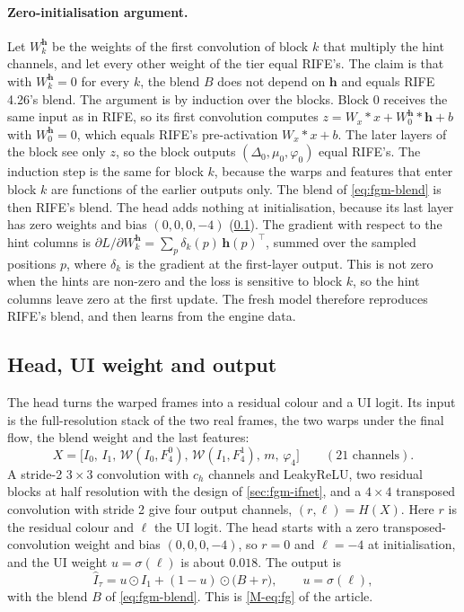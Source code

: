 \paragraph{Zero-initialisation argument.} Let $W^{\mathbf h}_k$ be the weights of the first convolution of block $k$ that multiply the hint channels, and let every other weight of the  tier equal RIFE's. The claim is that with $W^{\mathbf h}_k=0$ for every $k$, the blend $B$ does not depend on $\mathbf h$ and equals RIFE 4.26's blend. The argument is by induction over the blocks. Block 0 receives the same input as in RIFE, so its first convolution computes $z=W_x*x+W^{\mathbf h}_0*\mathbf h+b$ with $W^{\mathbf h}_0=0$, which equals RIFE's pre-activation $W_x*x+b$. The later layers of the block see only $z$, so the block outputs $(\Delta_0,\mu_0,\varphi_0)$ equal RIFE's. The induction step is the same for block $k$, because the warps and features that enter block $k$ are functions of the earlier outputs only. The blend of \cref{eq:fgm-blend} is then RIFE's blend. The head adds nothing at initialisation, because its last layer has zero weights and bias $(0,0,0,-4)$ (\cref{sec:fgm-output}). The gradient with respect to the hint columns is $\partial L/\partial W^{\mathbf h}_k=\sum_p \delta_k(p)\,\mathbf h(p)^{\top}$, summed over the sampled positions $p$, where $\delta_k$ is the gradient at the first-layer output. This is not zero when the hints are non-zero and the loss is sensitive to block $k$, so the hint columns leave zero at the first update. The fresh model therefore reproduces RIFE's blend, and then learns from the engine data.

\subsection{Head, UI weight and output}\label{sec:fgm-output}

The head turns the warped frames into a residual colour and a UI logit. Its input is the full-resolution stack of the two real frames, the two warps under the final flow, the blend weight and the last features:
\begin{equation}
X=\big[I_0,\,I_1,\,\mathcal W(I_0,F_4^0),\,\mathcal W(I_1,F_4^1),\,m,\,\varphi_4\big]\qquad(21\text{ channels}).\label{eq:fgm-head-in}
\end{equation}
A stride-2 $3\times3$ convolution with $c_h$ channels and LeakyReLU, two residual blocks at half resolution with the design of \cref{sec:fgm-ifnet}, and a $4\times4$ transposed convolution with stride 2 give four output channels, $(r,\ell)=H(X)$. Here $r$ is the residual colour and $\ell$ the UI logit. The head starts with a zero transposed-convolution weight and bias $(0,0,0,-4)$, so $r=0$ and $\ell=-4$ at initialisation, and the UI weight $u=\sigma(\ell)$ is about $0.018$. The output is
\begin{equation}
\hat I_\tau=u\odot I_1+(1-u)\odot\big(B+r\big),\qquad u=\sigma(\ell),\label{eq:fgm-out}
\end{equation}
with the blend $B$ of \cref{eq:fgm-blend}. This is \cref{M-eq:fg} of the article.

